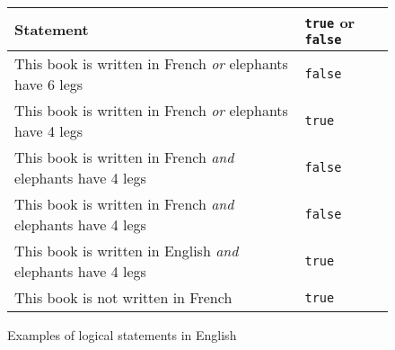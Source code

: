 





\begin {figure}

\begin {tabular} {l | l}
Statement & \texttt {true} or \texttt {false}		\\
\hline
This book is written in French
\emph {or} elephants have 6 legs
	&  \texttt {false}		\\

This book is written in French
\emph {or} elephants have 4 legs
	&  \texttt {true}		\\

This book is written in French
\emph {and} elephants have 4 legs
	&  \texttt {false}		\\

This book is written in French
\emph {and} elephants have 4 legs
	&  \texttt {false}		\\

This book is written in English
\emph {and} elephants have 4 legs
	&  \texttt {true}		\\

This book is not written in French
	&  \texttt {true}		\\
	
\end {tabular}


\caption {Examples of logical statements
in English}
\label {fig:boolExamples}

\end {figure}


